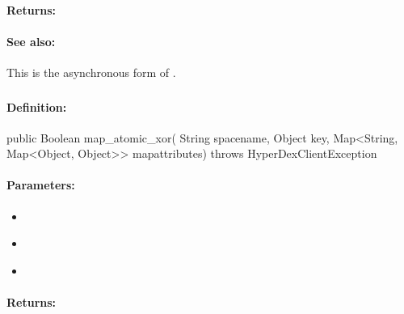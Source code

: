 \paragraph{Returns:}


\paragraph{See also:}  This is the asynchronous form of .

\pagebreak
\subsubsection{}
\label{api:java:map_atomic_xor}


\paragraph{Definition:}
\begin{javacode}
public Boolean map_atomic_xor(
        String spacename,
        Object key,
        Map<String, Map<Object, Object>> mapattributes) throws HyperDexClientException
\end{javacode}

\paragraph{Parameters:}
\begin{itemize}[noitemsep]
\item {}\\

\item {}\\

\item {}\\

\end{itemize}

\paragraph{Returns:}


